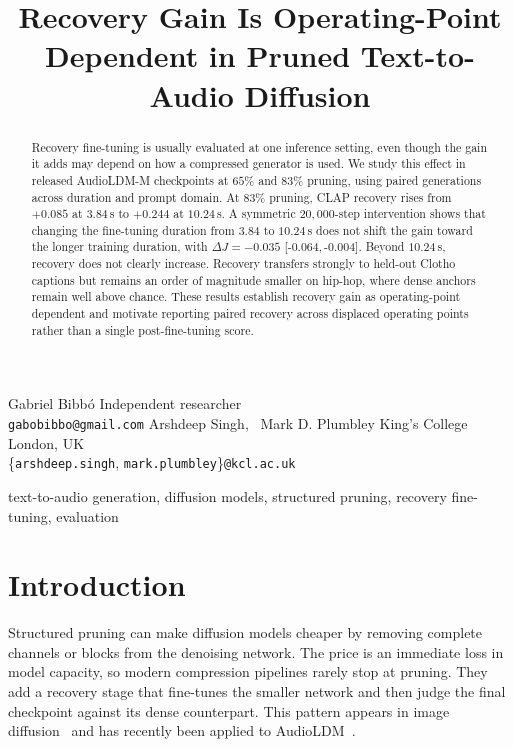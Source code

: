 \documentclass{article}
\newcommand{\ci}[2]{[{#1},\,{#2}]}
\begin{document}
\ninept

\title{Recovery Gain Is Operating-Point Dependent in Pruned Text-to-Audio Diffusion}

\twoauthors
  {Gabriel Bibb\'o}
  {Independent researcher \\
   \texttt{gabobibbo@gmail.com}}
  {Arshdeep Singh, \, Mark D. Plumbley}
  {King's College London, UK \\
   \{\texttt{arshdeep.singh}, \texttt{mark.plumbley}\}\texttt{@kcl.ac.uk}}

\maketitle

\begin{abstract}
Recovery fine-tuning is usually evaluated at one inference setting, even though the gain it adds may depend on how a compressed generator is used. We study this effect in released AudioLDM-M checkpoints at $65\%$ and $83\%$ pruning, using paired generations across duration and prompt domain. At $83\%$ pruning, CLAP recovery rises from $+0.085$ at $3.84$\,s to $+0.244$ at $10.24$\,s. A symmetric $20{,}000$-step intervention shows that changing the fine-tuning duration from $3.84$ to $10.24$\,s does not shift the gain toward the longer training duration, with $\Delta J=-0.035$ \ci{-0.064}{-0.004}. Beyond $10.24$\,s, recovery does not clearly increase. Recovery transfers strongly to held-out Clotho captions but remains an order of magnitude smaller on hip-hop, where dense anchors remain well above chance. These results establish recovery gain as operating-point dependent and motivate reporting paired recovery across displaced operating points rather than a single post-fine-tuning score.
\end{abstract}

\begin{keywords}
text-to-audio generation, diffusion models, structured pruning, recovery fine-tuning, evaluation
\end{keywords}

\section{Introduction}
Structured pruning can make diffusion models cheaper by removing complete channels or blocks from the denoising network. The price is an immediate loss in model capacity, so modern compression pipelines rarely stop at pruning. They add a recovery stage that fine-tunes the smaller network and then judge the final checkpoint against its dense counterpart. This pattern appears in image diffusion~\cite{fang2023diffpruning,kim2024bksdm,fang2025tinyfusion} and has recently been applied to AudioLDM~\cite{singh2026pruning}.
\end{document}

